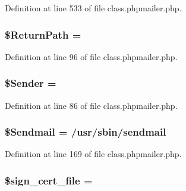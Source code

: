 Definition at line 533 of file class.\+phpmailer.\+php.

\subsubsection[{\texorpdfstring{\$\+Return\+Path}{$ReturnPath}}]{\setlength{\rightskip}{0pt plus 5cm}\$Return\+Path = \textquotesingle{}\textquotesingle{}}\hypertarget{class_p_h_p_mailer_a51413bc6dfa3e9122897131c4b369a19}{}\label{class_p_h_p_mailer_a51413bc6dfa3e9122897131c4b369a19}


Definition at line 96 of file class.\+phpmailer.\+php.

\subsubsection[{\texorpdfstring{\$\+Sender}{$Sender}}]{\setlength{\rightskip}{0pt plus 5cm}\$Sender = \textquotesingle{}\textquotesingle{}}\hypertarget{class_p_h_p_mailer_a0fd52b1481fe1434c5810ca3cb098985}{}\label{class_p_h_p_mailer_a0fd52b1481fe1434c5810ca3cb098985}


Definition at line 86 of file class.\+phpmailer.\+php.

\subsubsection[{\texorpdfstring{\$\+Sendmail}{$Sendmail}}]{\setlength{\rightskip}{0pt plus 5cm}\$Sendmail = \textquotesingle{}/usr/sbin/sendmail\textquotesingle{}}\hypertarget{class_p_h_p_mailer_aea0de75e10af3f581a0a412f41b9db66}{}\label{class_p_h_p_mailer_aea0de75e10af3f581a0a412f41b9db66}


Definition at line 169 of file class.\+phpmailer.\+php.

\subsubsection[{\texorpdfstring{\$sign\+\_\+cert\+\_\+file}{$sign_cert_file}}]{\setlength{\rightskip}{0pt plus 5cm}\$sign\+\_\+cert\+\_\+file = \textquotesingle{}\textquotesingle{}\hspace{0.3cm}{\ttfamily [protected]}}\hypertarget{class_p_h_p_mailer_a333572c0adf8b31023c7d868e20b8b8b}{}\label{class_p_h_p_mailer_a333572c0adf8b31023c7d868e20b8b8b}


